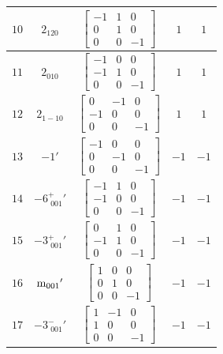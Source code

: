 \documentclass[fleqn,8pt]{jsarticle}
\begin{document}
\begin{longtable}{ccccc}
$ 10 $ & $ 2{}_{120} $ & $ \begin{bmatrix} -1 & 1 & 0 \\ 0 & 1 & 0 \\ 0 & 0 & -1 \end{bmatrix} $ & $ 1 $ & $ 1 $ \\ \hline
$ 11 $ & $ 2{}_{010} $ & $ \begin{bmatrix} -1 & 0 & 0 \\ -1 & 1 & 0 \\ 0 & 0 & -1 \end{bmatrix} $ & $ 1 $ & $ 1 $ \\ \hline
$ 12 $ & $ 2{}_{1-10} $ & $ \begin{bmatrix} 0 & -1 & 0 \\ -1 & 0 & 0 \\ 0 & 0 & -1 \end{bmatrix} $ & $ 1 $ & $ 1 $ \\ \hline
$ 13 $ & $ -1{}' $ & $ \begin{bmatrix} -1 & 0 & 0 \\ 0 & -1 & 0 \\ 0 & 0 & -1 \end{bmatrix} $ & $ -1 $ & $ -1 $ \\ \hline
$ 14 $ & $ -6^{+}_{\,\,001}{}' $ & $ \begin{bmatrix} -1 & 1 & 0 \\ -1 & 0 & 0 \\ 0 & 0 & -1 \end{bmatrix} $ & $ -1 $ & $ -1 $ \\ \hline
$ 15 $ & $ -3^{+}_{\,\,001}{}' $ & $ \begin{bmatrix} 0 & 1 & 0 \\ -1 & 1 & 0 \\ 0 & 0 & -1 \end{bmatrix} $ & $ -1 $ & $ -1 $ \\ \hline
$ 16 $ & $ {\rm m}_{001}{}' $ & $ \begin{bmatrix} 1 & 0 & 0 \\ 0 & 1 & 0 \\ 0 & 0 & -1 \end{bmatrix} $ & $ -1 $ & $ -1 $ \\ \hline
$ 17 $ & $ -3^{-}_{\,\,001}{}' $ & $ \begin{bmatrix} 1 & -1 & 0 \\ 1 & 0 & 0 \\ 0 & 0 & -1 \end{bmatrix} $ & $ -1 $ & $ -1 $ \\ \hline

\end{longtable}
\end{document}

